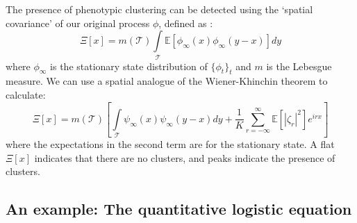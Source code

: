 The presence of phenotypic clustering can be detected using the `spatial covariance' of our original process $\phi$, defined as \citep{rogers_demographic_2012}:
\begin{equation}
\label{spatial_covariance_defn}
\Xi[x] = m(\mathcal{T})\int\limits_{\mathcal{T}}\mathbb{E}[\phi_{\infty}(x)\phi_{\infty}(y-x)]dy
\end{equation}
where $\phi_{\infty}$ is the stationary state distribution of $\{\phi_t\}_{t}$ and $m$ is the Lebesgue measure. We can use a spatial analogue of the Wiener-Khinchin theorem to calculate:
\begin{equation}
\label{spatial_covariance_zeta}
\Xi[x] = m(\mathcal{T})\left[\int\limits_{\mathcal{T}}\psi_{\infty}(x)\psi_{\infty}(y-x)dy + \frac{1}{K}\sum\limits_{r=-\infty}^{\infty}\mathbb{E}[|\zeta_r|^2]e^{irx}\right]
\end{equation}
where the expectations in the second term are for the stationary state. A flat $\Xi[x]$ indicates that there are no clusters, and peaks indicate the presence of clusters.

\subsection{An example: The quantitative logistic equation}

